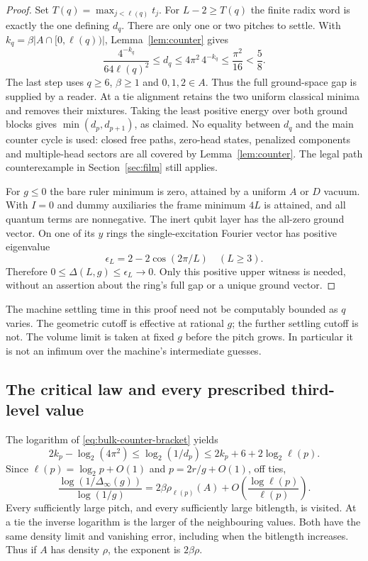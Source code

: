 \begin{proof}
Set $T(q)=\max_{j<\ell(q)}t_j$. For $L-2\geq T(q)$ the finite
radix word is exactly the one defining $d_q$. There are only one or
two pitches to settle. With
$k_q=\beta|A\cap[0,\ell(q))|$, Lemma~\ref{lem:counter} gives
\begin{equation}\label{eq:bulk-counter-bracket}
 \frac{4^{-k_q}}{64\ell(q)^2}\leq d_q
 \leq 4\pi^2\,4^{-k_q}\leq\frac{\pi^2}{16}<\frac58.
\end{equation}
The last step uses $q\geq6$, $\beta\geq1$ and $0,1,2\in A$.
Thus the full ground-space gap is supplied by a reader. At a tie
alignment retains the two uniform classical minima and removes their
mixtures. Taking the least positive energy over both ground blocks
gives $\min(d_p,d_{p+1})$, as claimed. No equality between $d_q$ and
the main counter cycle is used: closed free paths, zero-head states,
penalized components and multiple-head sectors are all covered by
Lemma~\ref{lem:counter}. The legal path counterexample in
Section~\ref{sec:film} still applies.

For $g\leq0$ the bare ruler minimum is zero, attained by a uniform
$A$ or $D$ vacuum. With $I=0$ and dummy auxiliaries the frame minimum
$4L$ is attained, and all quantum terms are nonnegative. The inert
qubit layer has the all-zero ground vector. On one of its $y$ rings
the single-excitation Fourier vector has positive eigenvalue
\[
 \epsilon_L=2-2\cos(2\pi/L)\quad(L\geq3).
\]
Therefore $0\leq\Delta(L,g)\leq\epsilon_L\to0$. Only this positive
upper witness is needed, without an assertion about the ring's full
gap or a unique ground vector.
\end{proof}

The machine settling time in this proof need not be computably bounded
as $q$ varies. The geometric cutoff is effective at rational $g$;
the further settling cutoff is not. The volume limit is taken at
fixed $g$ before the pitch grows. In particular it is not an infimum
over the machine's intermediate guesses.

\subsection{The critical law and every prescribed third-level value}
The logarithm of \eqref{eq:bulk-counter-bracket} yields
\[
 2k_p-\log_2(4\pi^2)\leq\log_2(1/d_p)
            \leq2k_p+6+2\log_2\ell(p).
\]
Since $\ell(p)=\log_2p+O(1)$ and $p=2r/g+O(1)$, off ties,
\begin{equation}\label{eq:bulk-density-exponent}
 \frac{\log(1/\Delta_\infty(g))}{\log(1/g)}
 =2\beta\rho_{\ell(p)}(A)
      +O\!\left(\frac{\log\ell(p)}{\ell(p)}\right).
\end{equation}
Every sufficiently large pitch, and every sufficiently large
bitlength, is visited. At a tie the inverse logarithm is the larger
of the neighbouring values. Both have the same density limit and
vanishing error, including when the bitlength increases. Thus if
$A$ has density $\rho$, the exponent is $2\beta\rho$.

